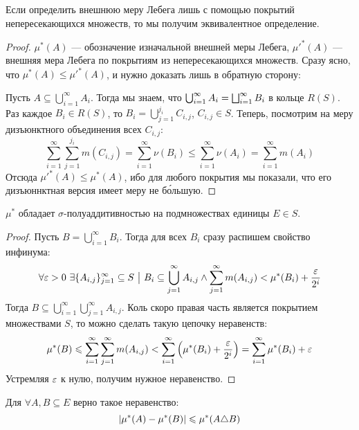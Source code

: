\begin{proposition}
	Если определить внешнюю меру Лебега лишь с помощью покрытий непересекающихся множеств, то мы получим эквивалентное определение.
\end{proposition}

\begin{proof}
	$\mu^*(A)$ --- обозначение изначальной внешней меры Лебега, $\mu'^*(A)$ --- внешняя мера Лебега по покрытиям из непересекающихся множеств. Сразу ясно, что $\mu^*(A) \le \mu'^*(A)$, и нужно доказать лишь в обратную сторону:
	
	Пусть $A \subseteq \bigcup_{i = 1}^\infty A_i$. Тогда мы знаем, что $\bigcup_{i = 1}^\infty A_i = \bigsqcup_{i = 1}^\infty B_i$ в кольце $R(S)$. Раз каждое $B_i \in R(S)$, то $B_i = \bigcup_{j = 1}^{j_i} C_{i, j}$, $C_{i, j} \in S$. Теперь, посмотрим на меру дизъюнктного объединения всех $C_{i, j}$:
	\[
		\sum_{i = 1}^\infty \sum_{j = 1}^{j_i} m(C_{i, j}) = \sum_{i = 1}^\infty \nu(B_i) \le \sum_{i = 1}^\infty \nu(A_i) = \sum_{i = 1}^\infty m(A_i)
	\]
	Отсюда $\mu'^*(A) \le \mu^*(A)$, ибо для любого покрытия мы показали, что его дизъюннктная версия имеет меру не б\'{о}льшую.
\end{proof}

\begin{theorem}
	$\mu^*$ обладает $\sigma$-полуаддитивностью на подмножествах единицы $E \in S$.
\end{theorem}

\begin{proof}
	Пусть $B = \bigcup_{i = 1}^\infty B_i$. Тогда для всех $B_i$ сразу распишем свойство инфинума:
	\[
		\forall \varepsilon > 0\ \exists \{A_{i, j}\}_{j = 1}^\infty \subseteq S \ \big|\  B_i \subseteq \bigcup_{j = 1}^\infty A_{i, j} \wedge \sum_{j = 1}^\infty m(A_{i, j}) < \mu^*(B_i) + \frac{\varepsilon}{2^i}
	\]
	Тогда $B \subseteq \bigcup_{i = 1}^\infty \bigcup_{j = 1}^\infty A_{i, j}$. Коль скоро правая часть является покрытием множествами $S$, то можно сделать такую цепочку неравенств:
	\[
		\mu^*(B) \leqslant \sum_{i = 1}^\infty \sum_{j = 1}^\infty m(A_{i, j}) < \sum_{i = 1}^\infty \left(\mu^*(B_i) + \frac{\varepsilon}{2^i}\right) = \sum_{i = 1}^\infty \mu^*(B_i) + \varepsilon
	\]
	Устремляя $\varepsilon$ к нулю, получим нужное неравенство.
\end{proof}

\begin{corollary}
	Для $\forall A, B \subseteq E$ верно такое неравенство:
	\[
		|\mu^*(A) - \mu^*(B)| \leqslant \mu^*(A \triangle B)
	\]
\end{corollary}

